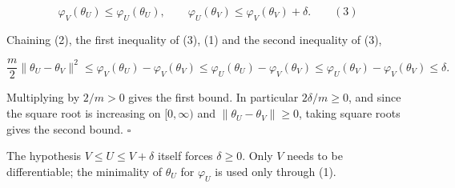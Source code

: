 \documentclass[11pt,a4paper]{report}
\begin{document}
\[\varphi_V(\theta_U)\le\varphi_U(\theta_U),\qquad\varphi_U(\theta_V)\le\varphi_V(\theta_V)+\delta.\qquad(3)\]


Chaining (2), the first inequality of (3), (1) and the second inequality of (3),


\[\frac m2\|\theta_U-\theta_V\|^2\le\varphi_V(\theta_U)-\varphi_V(\theta_V)\le\varphi_U(\theta_U)-\varphi_V(\theta_V)\le\varphi_U(\theta_V)-\varphi_V(\theta_V)\le\delta .\]


Multiplying by \(2/m>0\) gives the first bound. In particular \(2\delta/m\ge0\), and since the square root is increasing on \([0,\infty)\) and \(\|\theta_U-\theta_V\|\ge0\), taking square roots gives the second bound. \(\square\)




The hypothesis \(V\le U\le V+\delta\) itself forces \(\delta\ge0\). Only \(V\) needs to be differentiable; the minimality of \(\theta_U\) for \(\varphi_U\) is used only through (1).
\end{document}
